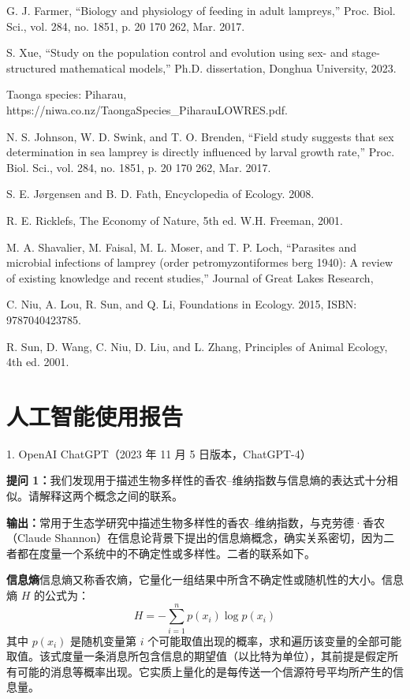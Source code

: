 \documentclass[11pt,a4paper]{ctexart}
\begin{document}
\noindent[4] G. J. Farmer, ``Biology and physiology of feeding in adult lampreys,'' Proc. Biol. Sci., vol. 284, no. 1851, p. 20 170 262, Mar. 2017.

\noindent[5] S. Xue, ``Study on the population control and evolution using sex- and stage- structured mathematical models,'' Ph.D. dissertation, Donghua University, 2023.

\noindent[6] Taonga species: Piharau, https://niwa.co.nz/TaongaSpecies\_PiharauLOWRES.pdf.

\noindent[7] N. S. Johnson, W. D. Swink, and T. O. Brenden, ``Field study suggests that sex determination in sea lamprey is directly influenced by larval growth rate,'' Proc. Biol. Sci., vol. 284, no. 1851, p. 20 170 262, Mar. 2017.

\noindent[8] S. E. J\o{}rgensen and B. D. Fath, Encyclopedia of Ecology. 2008.

\noindent[9] R. E. Ricklefs, The Economy of Nature, 5th ed. W.H. Freeman, 2001.

\noindent[10] M. A. Shavalier, M. Faisal, M. L. Moser, and T. P. Loch, ``Parasites and microbial infections of lamprey (order petromyzontiformes berg 1940): A review of existing knowledge and recent studies,'' Journal of Great Lakes Research,

\noindent[11] C. Niu, A. Lou, R. Sun, and Q. Li, Foundations in Ecology. 2015, ISBN: 9787040423785.

\noindent[12] R. Sun, D. Wang, C. Niu, D. Liu, and L. Zhang, Principles of Animal Ecology, 4th ed. 2001.

\section*{人工智能使用报告}

1. OpenAI ChatGPT（2023 年 11 月 5 日版本，ChatGPT-4）

\noindent\textbf{提问 1：}我们发现用于描述生物多样性的香农–维纳指数与信息熵的表达式十分相似。请解释这两个概念之间的联系。

\noindent\textbf{输出：}常用于生态学研究中描述生物多样性的香农–维纳指数，与克劳德·香农（Claude Shannon）在信息论背景下提出的信息熵概念，确实关系密切，因为二者都在度量一个系统中的不确定性或多样性。二者的联系如下。

\noindent\textbf{信息熵}\quad 信息熵又称香农熵，它量化一组结果中所含不确定性或随机性的大小。信息熵 $H$ 的公式为：
\[
H=-\sum_{i=1}^{n}p\left(x_i\right)\log p\left(x_i\right)
\]
其中 $p(x_i)$ 是随机变量第 $i$ 个可能取值出现的概率，求和遍历该变量的全部可能取值。该式度量一条消息所包含信息的期望值（以比特为单位），其前提是假定所有可能的消息等概率出现。它实质上量化的是每传送一个信源符号平均所产生的信息量。
\end{document}
